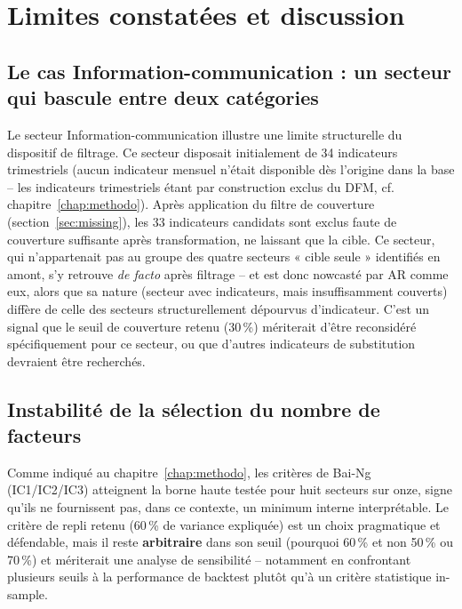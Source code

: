 \documentclass[11pt,a4paper]{report}
\begin{document}
\chapter{Limites constatées et discussion}
\label{chap:limites}

\section{Le cas Information-communication : un secteur qui bascule entre deux catégories}
\label{sec:limites-info}

Le secteur Information-communication illustre une limite structurelle du dispositif de filtrage. Ce secteur disposait initialement de 34 indicateurs trimestriels (aucun indicateur mensuel n'était disponible dès l'origine dans la base -- les indicateurs trimestriels étant par construction exclus du DFM, cf. chapitre~\ref{chap:methodo}). Après application du filtre de couverture (section~\ref{sec:missing}), les 33 indicateurs candidats sont exclus faute de couverture suffisante après transformation, ne laissant que la cible. Ce secteur, qui n'appartenait pas au groupe des quatre secteurs « cible seule » identifiés en amont, s'y retrouve \emph{de facto} après filtrage -- et est donc nowcasté par AR comme eux, alors que sa nature (secteur avec indicateurs, mais insuffisamment couverts) diffère de celle des secteurs structurellement dépourvus d'indicateur. C'est un signal que le seuil de couverture retenu (30\,\%) mériterait d'être reconsidéré spécifiquement pour ce secteur, ou que d'autres indicateurs de substitution devraient être recherchés.

\section{Instabilité de la sélection du nombre de facteurs}

Comme indiqué au chapitre~\ref{chap:methodo}, les critères de Bai-Ng (IC1/IC2/IC3) atteignent la borne haute testée pour huit secteurs sur onze, signe qu'ils ne fournissent pas, dans ce contexte, un minimum interne interprétable. Le critère de repli retenu (60\,\% de variance expliquée) est un choix pragmatique et défendable, mais il reste \textbf{arbitraire} dans son seuil (pourquoi 60\,\% et non 50\,\% ou 70\,\%) et mériterait une analyse de sensibilité -- notamment en confrontant plusieurs seuils à la performance de backtest plutôt qu'à un critère statistique in-sample.
\end{document}
